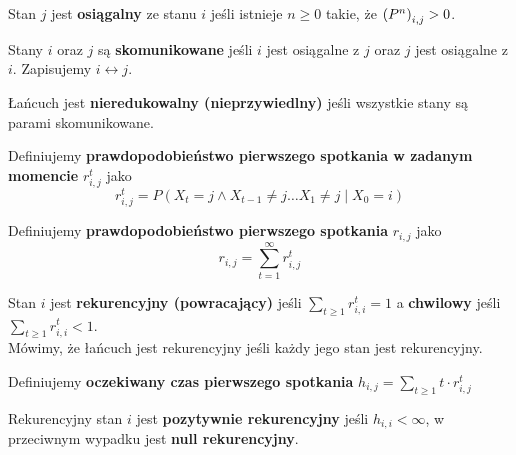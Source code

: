 \begin{definition}
    Stan \(j\) jest \textbf{osiągalny} ze stanu \(i\) jeśli istnieje \(n \geq 0\) takie, że
    \(\left(P^n\right)_{i, j} > 0\).
\end{definition}

\begin{definition}
    Stany \(i\) oraz \(j\) są \textbf{skomunikowane} jeśli \(i\) jest osiągalne z \(j\) oraz
    \(j\) jest osiągalne z \(i\). Zapisujemy \( i \leftrightarrow j \).
\end{definition}

\begin{definition}
    Łańcuch jest \textbf{nieredukowalny (nieprzywiedlny)} jeśli wszystkie stany są parami skomunikowane.
\end{definition}

\begin{definition}
    Definiujemy \textbf{prawdopodobieństwo pierwszego spotkania w zadanym momencie} \(r_{i, j}^t\) 
    jako 
    \[
        r_{i, j}^t = P(X_t = j \land X_{t-1} \neq j \dots X_{1} \neq j \mid X_0 = i)  
    \]
\end{definition}

\begin{definition}
    Definiujemy \textbf{prawdopodobieństwo pierwszego spotkania} \(r_{i, j}\) 
    jako 
    \[
        r_{i, j} = \sum_{t=1}^{\infty} r_{i,j}^{t}
    \]
\end{definition}

\begin{definition}
    Stan \(i\) jest \textbf{rekurencyjny (powracający)} jeśli \( \sum_{t \geq 1} r_{i, i}^t = 1 \)
    a \textbf{chwilowy} jeśli \( \sum_{t \geq 1} r_{i, i}^t < 1 \). \\
    Mówimy, że łańcuch jest rekurencyjny jeśli każdy jego stan jest rekurencyjny.
\end{definition}
 
 \begin{definition}
    Definiujemy \textbf{oczekiwany czas pierwszego spotkania} \(h_{i, j} = \sum_{t \geq 1} t \cdot r_{i, j}^t\)
 \end{definition}

\begin{definition}
   Rekurencyjny stan \(i\) jest \textbf{pozytywnie rekurencyjny} jeśli \(h_{i, i} < \infty\),
   w przeciwnym wypadku jest \textbf{null rekurencyjny}.
\end{definition}

